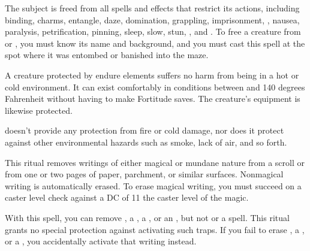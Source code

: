 \begin{spelleffect}
  The subject is freed from all spells and effects that restrict its actions, including binding, charms, entangle, daze, domination, grappling, imprisonment, , nausea, paralysis, petrification, pinning, sleep, slow, stun, , and . To free a creature from  or , you must know its name and background, and you must cast this spell at the spot where it was entombed or banished into the maze.
\end{spelleffect}

\spelldur{\durext}
\begin{spelleffect}
A creature protected by endure elements suffers no harm from being in a hot or cold environment. It can exist comfortably in conditions between  and 140 degrees Fahrenheit without having to make Fortitude saves. The creature's equipment is likewise protected.
\end{spelleffect}
\begin{spellnotes}
\par {} doesn't provide any protection from fire or cold damage, nor does it protect against other environmental hazards such as smoke, lack of air, and so forth.
\end{spellnotes}

\begin{spelleffect}
This ritual removes writings of either magical or mundane nature from a scroll or from one or two pages of paper, parchment, or similar surfaces. Nonmagical writing is automatically erased. To erase magical writing, you must succeed on a caster level check against a DC of 11 \add the caster level of the magic. 
\end{spelleffect}
\begin{spellnotes}
With this spell, you can remove , a , a , or an , but not  or a  spell. This ritual grants no special protection against activating such traps. If you fail to erase , a , or a , you accidentally activate that writing instead.
\end{spellnotes}

